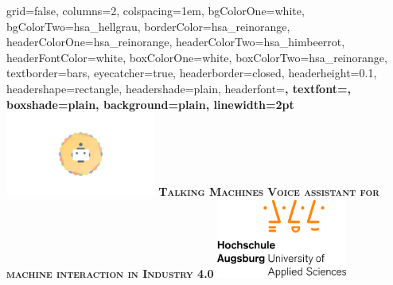 \documentclass[portrait,final,a2paper,fontscale=0.79]{baposter}
\begin{document}



\begin{poster}%
  {
  grid=false,
  columns=2,
  colspacing=1em,
  bgColorOne=white,
  bgColorTwo=hsa_hellgrau,
  borderColor=hsa_reinorange,
  headerColorOne=hsa_reinorange,
  headerColorTwo=hsa_himbeerrot,
  headerFontColor=white,
  boxColorOne=white,
  boxColorTwo=hsa_reinorange,
  textborder=bars,
  eyecatcher=true,
  headerborder=closed,
  headerheight=0.1\textheight,
  headershape=rectangle,
  headershade=plain,
  headerfont=\Large\bf\sc, %
  textfont={\sf\setlength{\parindent}{1.5em}},
  boxshade=plain,
  background=plain,
  linewidth=2pt
  }
  {
	\includegraphics[height=7.5em]{images/talking_machines_logo.png}
  } 
  {\bf\textsc{Talking Machines}\vspace{0.5em}}
  {\bf\textsc{Voice assistant for machine interaction in Industry 4.0}\vspace{0.5em}}
  {%
    \includegraphics[height=7em]{images/hsa_logo_normal.jpg}
}
\end{poster}
\end{document}
